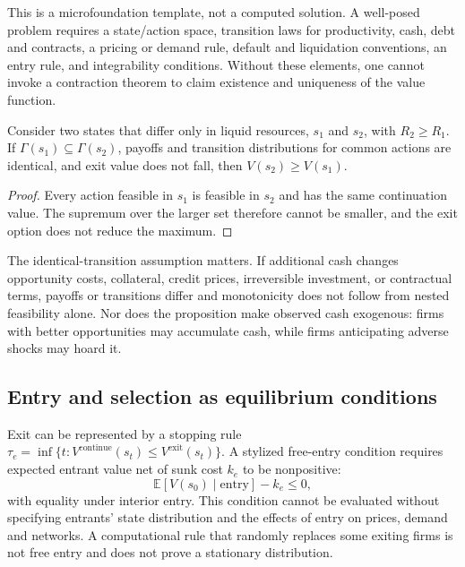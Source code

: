 \documentclass[11pt,a4paper]{article}
\begin{document}
This is a microfoundation template, not a computed solution. A well-posed problem requires a state/action space, transition laws for productivity, cash, debt and contracts, a pricing or demand rule, default and liquidation conventions, an entry rule, and integrability conditions. Without these elements, one cannot invoke a contraction theorem to claim existence and uniqueness of the value function.

\begin{proposition}
Consider two states that differ only in liquid resources, $s_1$ and $s_2$, with $R_2\geq R_1$. If $\Gamma(s_1)\subseteq\Gamma(s_2)$, payoffs and transition distributions for common actions are identical, and exit value does not fall, then $V(s_2)\geq V(s_1)$.
\end{proposition}
\begin{proof}
Every action feasible in $s_1$ is feasible in $s_2$ and has the same continuation value. The supremum over the larger set therefore cannot be smaller, and the exit option does not reduce the maximum.\end{proof}

The identical-transition assumption matters. If additional cash changes opportunity costs, collateral, credit prices, irreversible investment, or contractual terms, payoffs or transitions differ and monotonicity does not follow from nested feasibility alone. Nor does the proposition make observed cash exogenous: firms with better opportunities may accumulate cash, while firms anticipating adverse shocks may hoard it.

\subsection{Entry and selection as equilibrium conditions}
Exit can be represented by a stopping rule $\tau_e=\inf\{t:V^{\mathrm{continue}}(s_t)\leq V^{\mathrm{exit}}(s_t)\}$. A stylized free-entry condition requires expected entrant value net of sunk cost $k_e$ to be nonpositive:
\begin{equation}
\mathbb E[V(s_0)\mid \text{entry}]-k_e\leq0,
\end{equation}
with equality under interior entry. This condition cannot be evaluated without specifying entrants' state distribution and the effects of entry on prices, demand and networks. A computational rule that randomly replaces some exiting firms is not free entry and does not prove a stationary distribution.
\end{document}
